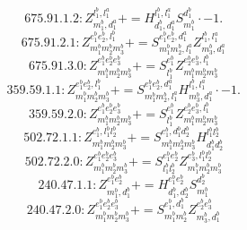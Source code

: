 \documentclass[letterpaper,10pt,fleqn,leqno,onecolumn]{article}
\begin{document}
\begin{equation} \;\;\;\;\;\;  675.91.1.2: Z^{l_{1}^{b},l_{1}^{a}}_{m_{1}^{b},d_{1}^{a}}+=H^{l_{1}^{b},l_{1}^{a}}_{d_{1}^{b},d_{1}^{a}}S^{d_{1}^{b}}_{m_{1}^{b}}\cdot -1. \end{equation}
\begin{equation} \;\;\;\;\;\;  675.91.2.1: Z^{e_{1}^{b}e_{2}^{b},l_{1}^{b}}_{m_{1}^{b}m_{2}^{b}m_{3}^{b}}+=S^{e_{1}^{b}e_{2}^{b},d_{1}^{a}}_{m_{1}^{b}m_{2}^{b},l_{1}^{a}}Z^{l_{1}^{b},l_{1}^{a}}_{m_{3}^{b},d_{1}^{a}} \end{equation}
\begin{equation} \;\;\;\;\;\;  675.91.3.0: Z^{e_{1}^{b}e_{2}^{b}e_{3}^{b}}_{m_{1}^{b}m_{2}^{b}m_{3}^{b}}+=S^{e_{1}^{b}}_{l_{1}^{b}}Z^{e_{2}^{b}e_{3}^{b},l_{1}^{b}}_{m_{1}^{b}m_{2}^{b}m_{3}^{b}} \end{equation}
\begin{equation} \;\;\;\;\;\;  359.59.1.1: Z^{e_{1}^{b}e_{2}^{b},l_{1}^{b}}_{m_{1}^{b}m_{2}^{b}m_{3}^{b}}+=S^{e_{1}^{b}e_{2}^{b},d_{1}^{a}}_{m_{1}^{b}m_{2}^{b},l_{1}^{a}}H^{l_{1}^{b},l_{1}^{a}}_{m_{3}^{b},d_{1}^{a}}\cdot -1. \end{equation}
\begin{equation} \;\;\;\;\;\;  359.59.2.0: Z^{e_{1}^{b}e_{2}^{b}e_{3}^{b}}_{m_{1}^{b}m_{2}^{b}m_{3}^{b}}+=S^{e_{1}^{b}}_{l_{1}^{b}}Z^{e_{2}^{b}e_{3}^{b},l_{1}^{b}}_{m_{1}^{b}m_{2}^{b}m_{3}^{b}} \end{equation}
\begin{equation} \;\;\;\;\;\;  502.72.1.1: Z^{e_{1}^{b},l_{1}^{b}l_{2}^{b}}_{m_{1}^{b}m_{2}^{b}m_{3}^{b}}+=S^{e_{1}^{b},d_{1}^{b}d_{2}^{b}}_{m_{1}^{b}m_{2}^{b}m_{3}^{b}}H^{l_{1}^{b}l_{2}^{b}}_{d_{1}^{b}d_{2}^{b}} \end{equation}
\begin{equation} \;\;\;\;\;\;  502.72.2.0: Z^{e_{1}^{b}e_{2}^{b}e_{3}^{b}}_{m_{1}^{b}m_{2}^{b}m_{3}^{b}}+=S^{e_{1}^{b}e_{2}^{b}}_{l_{1}^{b}l_{2}^{b}}Z^{e_{3}^{b},l_{1}^{b}l_{2}^{b}}_{m_{1}^{b}m_{2}^{b}m_{3}^{b}} \end{equation}
\begin{equation} \;\;\;\;\;\;  240.47.1.1: Z^{e_{1}^{b}e_{2}^{b}}_{m_{1}^{b},d_{1}^{b}}+=H^{e_{1}^{b}e_{2}^{b}}_{d_{1}^{b},d_{2}^{b}}S^{d_{2}^{b}}_{m_{1}^{b}} \end{equation}
\begin{equation} \;\;\;\;\;\;  240.47.2.0: Z^{e_{1}^{b}e_{2}^{b}e_{3}^{b}}_{m_{1}^{b}m_{2}^{b}m_{3}^{b}}+=S^{e_{1}^{b},d_{1}^{b}}_{m_{1}^{b}m_{2}^{b}}Z^{e_{2}^{b}e_{3}^{b}}_{m_{3}^{b},d_{1}^{b}} \end{equation}
\end{document}
